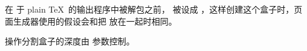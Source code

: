 \documentclass{book}
\begin{document}
在  于 plain \TeX\ 的输出程序中被解包之前， 被设成 ，这样创建这个盒子时，页面生成器使用的假设会和把  放在一起时相同。

 操作分割盒子的深度由  参数控制。


\endofchapter
\end{document}

